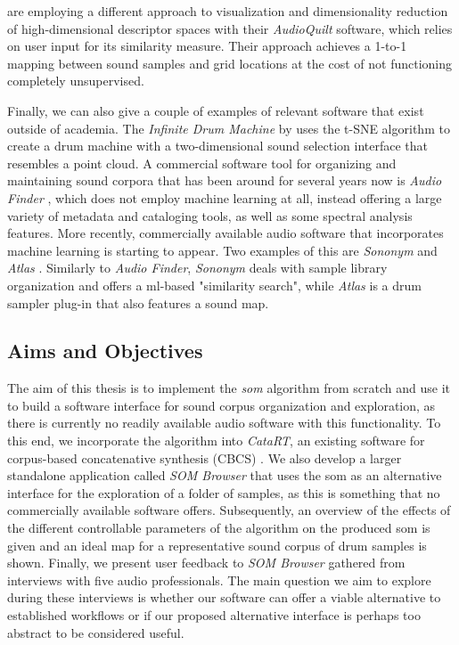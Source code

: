 \smallskip

\citet{fried2014} are employing a different approach to visualization and
dimensionality reduction of high-dimensional descriptor spaces with their
\textit{AudioQuilt} software, which relies on user input for its similarity
measure. Their approach achieves a 1-to-1 mapping between sound samples and
grid locations at the cost of not functioning completely unsupervised.

\smallskip

Finally, we can also give a couple of examples of relevant software that exist
outside of academia. The \textit{Infinite Drum Machine} by \citet{mcdonald2017}
uses the t-SNE algorithm \citep{maaten2008} to create a drum machine with a
two-dimensional sound selection interface that resembles a point cloud. A
commercial software tool for organizing and maintaining sound corpora that has
been around for several years now is \textit{Audio Finder}
\citep{audiofinder2019}, which does not employ machine learning at all, instead
offering a large variety of metadata and cataloging tools, as well as some
spectral analysis features. More recently, commercially available audio software
that incorporates machine learning is starting to appear. Two examples of this
are \textit{Sononym} \citep{nielsen2018} and \textit{Atlas} \citep{atlas2018}.
Similarly to \textit{Audio Finder}, \textit{Sononym} deals with sample library
organization and offers a \gls{ml}-based "similarity search", while
\textit{Atlas} is a drum sampler plug-in that also features a sound map.

\subsection{Aims and Objectives}
\label{subsec:aims}
The aim of this thesis is to implement the \textit{\gls{som}} algorithm from
scratch and use it to build a software interface for sound corpus organization
and exploration, as there is currently no readily available audio software with
this functionality. To this end, we incorporate the algorithm into
\textit{CataRT}, an existing software for corpus-based concatenative synthesis
(CBCS) \citep{schwarz2006}. We also develop a larger standalone application
called \textit{SOM Browser} that uses the \gls{som} as an alternative interface
for the exploration of a folder of samples, as this is something that no
commercially available software offers. Subsequently, an overview of the effects
of the different controllable parameters of the algorithm on the produced
\gls{som} is given and an ideal map for a representative sound corpus of drum
samples is shown. Finally, we present user feedback to \textit{SOM Browser}
gathered from interviews with five audio professionals. The main question we aim
to explore during these interviews is whether our software can offer a viable
alternative to established workflows or if our proposed alternative interface is
perhaps too abstract to be considered useful.
